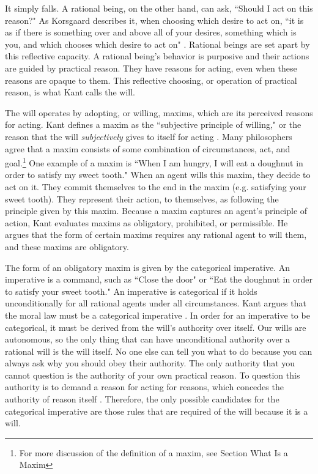 \begin{isabellebody}
\begin{isamarkuptext}
It simply falls. A rational being, on the other hand, can ask, ``Should I act on this reason?" 
As Korsgaard describes it, when choosing which desire to act on, ``it is as if there is something over 
and above all of your desires, something which is you, and which chooses which desire to act on" \citep[100]{sources}. 
Rational beings are set apart by this reflective capacity. A rational being's behavior is purposive and 
their actions are guided by practical reason. They have reasons for acting, even when these reasons are
opaque to them. This reflective choosing, or operation of practical reason, is what Kant calls the will. 

The will operates by adopting, or willing, maxims, which are its perceived reasons for acting. Kant defines a maxim as 
the ``subjective principle of willing," or the reason that the will \emph{subjectively} gives 
to itself for acting \citep[16 footnote 1]{groundwork}. Many philosophers agree that a maxim consists 
of some combination of circumstances, 
act, and goal.\footnote{For more discussion of the definition of a maxim, see Section What Is a Maxim}
One example of a maxim is ``When I am hungry, I will eat a doughnut in order to satisfy my sweet tooth." 
When an agent wills this maxim, they decide to act on it. They commit themselves to the end in the maxim 
(e.g. satisfying your sweet tooth). They represent their action, to themselves, as following the 
principle given by this maxim. Because a maxim captures an agent's principle of action, Kant evaluates
maxims as obligatory, prohibited, or permissible. He argues that the form of certain maxims 
requires any rational agent to will them, and these maxims are obligatory. 

The form of an obligatory maxim is given by the categorical imperative. 
An imperative is a command, such as ``Close the door" or ``Eat the doughnut in order to satisfy your 
sweet tooth." An imperative is categorical if it holds unconditionally for all rational agents under all 
circumstances. Kant argues that the moral law must be a categorical imperative \citep[5]{groundwork}. 
In order for an imperative to be categorical, it must be derived from the will's authority over itself. 
Our wills are autonomous, so the only thing that can have unconditional authority over a rational will is 
the will itself. No one else can tell you what to do because you can always ask why you 
should obey their authority. The only authority that you cannot question is the authority of your own 
practical reason. To question this authority is to demand a reason for acting for reasons, which 
concedes the authority of reason itself \citep[23]{velleman}. Therefore, the only possible candidates 
for the categorical imperative are those rules that are required of the will because it is a will. 


\end{isamarkuptext}
\end{isabellebody}
